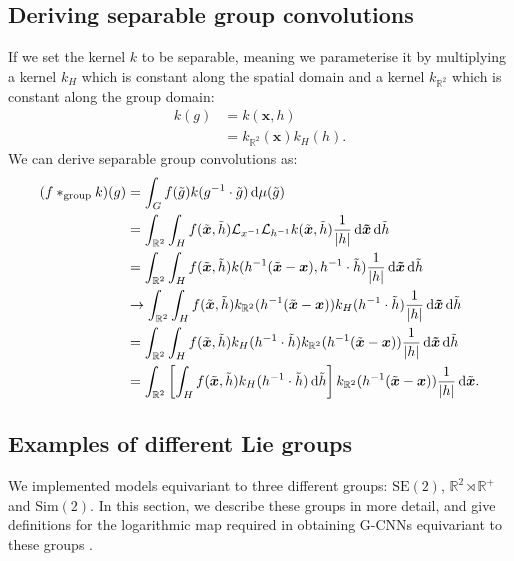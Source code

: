 \documentclass[nohyperref]{article}
\theoremstyle{plain}
\theoremstyle{definition}
\theoremstyle{remark}
\newcommand{\R}{\mathbb{R}}
\begin{document}
\subsection{Deriving separable group convolutions}
\label{app:derivingsepgconv}
If we set the kernel $k$ to be separable, meaning we parameterise it by multiplying a kernel $k_H$ which is constant along the spatial domain and a kernel $k_{\mathbb{R}^2}$ which is constant along the group domain:
\begin{align}
    k(g) &= k(\boldsymbol{x}, h) \nonumber\\
    &= k_{\mathbb{R}^2}(\boldsymbol{x}) k_H(h).
\end{align}
We can derive separable group convolutions as:
\begin{align}
    (f *_{\mathrm{group}} k) (g)&=\int_G f(\tilde{g})k(g^{-1} \cdot \tilde{g})\,{\rm d}\mu(\tilde{g}) \nonumber \\
    &=\int_{\R^2}\int_H f(\tilde{\boldsymbol{x}}, \tilde{h})\mathcal{L}_{x^{-1}}\mathcal{L}_{h^{-1}}k(\tilde{\boldsymbol{x}}, \tilde{h})\frac{1}{|h|} \,{\rm d}\boldsymbol{\tilde{x}}\,{\rm d}\tilde{h}\nonumber  \\
    &=\int_{\R^2}\int_H f(\tilde{\boldsymbol{x}},\tilde{h})k(h^{-1}(\tilde{\boldsymbol{x}}-\boldsymbol{x}), h^{-1}\cdot \tilde{h})\dfrac{1}{|h|} \,{\rm d}\boldsymbol{\tilde{x}}\,{\rm d}\tilde{h} \nonumber \\
    &\rightarrow \int_{\R^2}\int_H f(\tilde{\boldsymbol{x}},\tilde{h})k_{\mathbb{R}^2}(h^{-1}(\tilde{\boldsymbol{x}}-\boldsymbol{x}))k_H(h^{-1}\cdot \tilde{h})\dfrac{1}{|h|} \,{\rm d}\boldsymbol{\tilde{x}}\,{\rm d}\tilde{h} \nonumber \\
    &= \int_{\R^2}\int_H f(\tilde{\boldsymbol{x}},\tilde{h})k_H(h^{-1}\cdot \tilde{h})k_{\mathbb{R}^2}(h^{-1}(\tilde{\boldsymbol{x}}-\boldsymbol{x}))\dfrac{1}{|h|} \,{\rm d}\boldsymbol{\tilde{x}}\,{\rm d}\tilde{h}\nonumber  \\
    &= \int_{\R^2}\left[\int_Hf(\tilde{\boldsymbol{x}},\tilde{h})k_H (h^{-1}\cdot \tilde{h})\,{\rm d}\tilde{h}\right]k_{\R^2}(h^{-1}(\tilde{\boldsymbol{x}}-\boldsymbol{x})) \frac{1}{|h|}\,{\rm d}\tilde{\boldsymbol{x}}. \label{eq:sepgconv_1}
\end{align}

\subsection{Examples of different Lie groups} \label{app:detailsliegroups}
We implemented models equivariant to three different groups: $\mathrm{SE(2)}$, $\mathbb{R}^2 \rtimes \mathbb{R}^+$ and $\mathrm{Sim(2)}$. In this section, we describe these groups in more detail, and give definitions for the logarithmic map required in obtaining G-CNNs equivariant to these groups \citep{bekkers2019b}.
\end{document}
